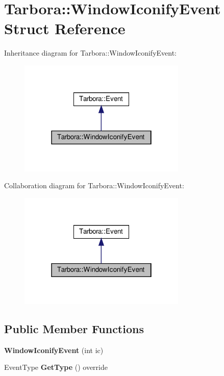 \hypertarget{structTarbora_1_1WindowIconifyEvent}{}\section{Tarbora\+:\+:Window\+Iconify\+Event Struct Reference}
\label{structTarbora_1_1WindowIconifyEvent}


Inheritance diagram for Tarbora\+:\+:Window\+Iconify\+Event\+:\nopagebreak
\begin{figure}[H]
\begin{center}
\leavevmode
\includegraphics[width=226pt]{structTarbora_1_1WindowIconifyEvent__inherit__graph}
\end{center}
\end{figure}


Collaboration diagram for Tarbora\+:\+:Window\+Iconify\+Event\+:\nopagebreak
\begin{figure}[H]
\begin{center}
\leavevmode
\includegraphics[width=226pt]{structTarbora_1_1WindowIconifyEvent__coll__graph}
\end{center}
\end{figure}
\subsection*{Public Member Functions}
\begin{DoxyCompactItemize}
\item 
\mbox{\label{structTarbora_1_1WindowIconifyEvent_a9b1c007ce49287452dcbd56a03c6c4f5}} 
{\bfseries Window\+Iconify\+Event} (int ic)
\item 
\mbox{\label{structTarbora_1_1WindowIconifyEvent_aea8811b80768249bee9cb1c97e817762}} 
Event\+Type {\bfseries Get\+Type} () override
\end{DoxyCompactItemize}
